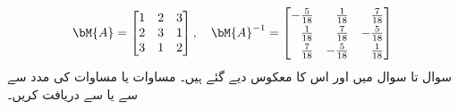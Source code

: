 \begin{align*}
\bM{A}=\begin{bmatrix*}[r] 1&2&3\\2&3&1\\3&1&2\end{bmatrix*},\quad \bM{A}^{-1}=
\begin{bmatrix*}[r]-\frac{5}{18}&\frac{1}{18}&\frac{7}{18}\\[0.5ex] \frac{1}{18}&\frac{7}{18}&-\frac{5}{18}\\[0.5ex]\frac{7}{18}&-\frac{5}{18}&\frac{1}{18} \end{bmatrix*}
\end{align*}
سوال  تا سوال  میں  اور اس کا معکوس  دیے گئے  ہیں۔ مساوات  یا مساوات  کی مدد سے  سے  یا  سے  دریافت کریں۔

